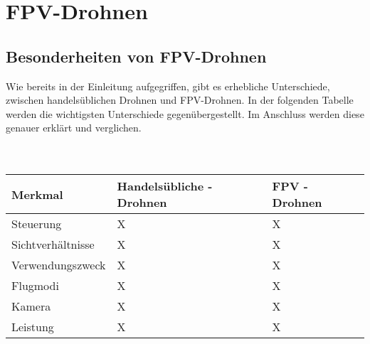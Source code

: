 \section[FPV-Drohnen]{FPV-Drohnen}
\subsection[Besonderheiten von FPV-Drohnen]{Besonderheiten von FPV-Drohnen}

Wie bereits in der Einleitung aufgegriffen, gibt es erhebliche Unterschiede, zwischen handelsüblichen Drohnen und FPV-Drohnen. In der folgenden Tabelle werden die wichtigsten Unterschiede gegenübergestellt. Im Anschluss werden diese genauer erklärt und verglichen. 
\\ \\ \\
\renewcommand{\arraystretch}{1.5}
\begin{tabular}{p{4cm}p{6cm}p{6cm}}
    \toprule
    \textbf{Merkmal} & \textbf{Handelsübliche - Drohnen} & \textbf{FPV - Drohnen} \\
    \midrule
    Steuerung           & X & X\\
    Sichtverhältnisse   & X & X\\
    Verwendungszweck    & X & X\\
    Flugmodi            & X & X\\
    Kamera              & X & X\\
    Leistung            & X & X\\
    \bottomrule
\end{tabular}







